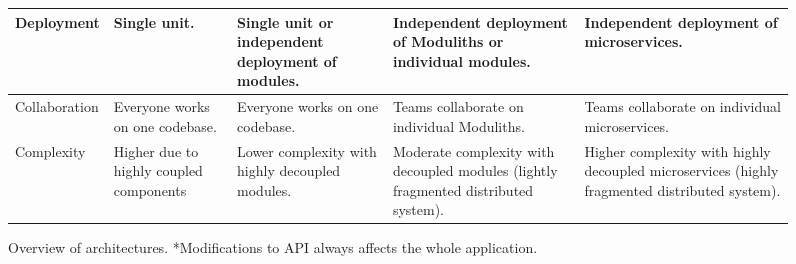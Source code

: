 \begin{sidewaysfigure}
\begin{tabular}{ |p{2.7cm}|p{3cm}|p{3cm}|p{4cm}|p{3cm}| }
        \hline
        Deployment            & Single unit.                                   & Single unit or independent deployment of modules. & Independent deployment of Moduliths or individual modules.                          & Independent deployment of microservices.                                                      \\
        \hline
        Collaboration         & Everyone works on one codebase.                & Everyone works on one codebase.                   & Teams collaborate on individual Moduliths.                                          & Teams collaborate on individual microservices.                                                \\
        \hline
        Complexity            & Higher due to highly coupled  components       & Lower complexity with highly decoupled modules.   & Moderate complexity with decoupled modules (lightly fragmented distributed system). & Higher complexity with highly decoupled microservices (highly fragmented distributed system). \\
        \hline
    \end{tabular}
    \caption{Overview of architectures. *Modifications to API always affects the whole application.\label{table:architecture_compare}}
\end{sidewaysfigure}